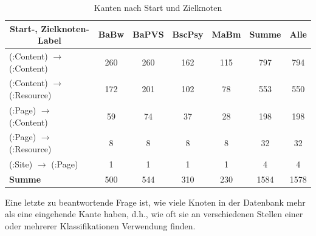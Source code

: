     \begin{table}[htb]
        \centering
        \begin{tabular}{|l|c|c|c|c|c|c|}
            \hline
            \multicolumn{1}{|c|}{\textbf{Start-, Zielknoten-Label}} & \textbf{BaBw} & \textbf{BaPVS} & \textbf{BscPsy} & \textbf{MaBm} & \textbf{Summe} & \textbf{Alle} \\ \hline
            (:Content) $\rightarrow$ (:Content)                           & 260           & 260            & 162             & 115           & 797            & 794           \\ \hline
            (:Content) $\rightarrow$ (:Resource)                         & 172           & 201            & 102             & 78            & 553            & 550           \\ \hline
            (:Page) $\rightarrow$ (:Content)                              & 59            & 74             & 37              & 28            & 198            & 198           \\ \hline
            (:Page) $\rightarrow$ (:Resource)                             & 8             & 8              & 8               & 8             & 32             & 32            \\ \hline
            (:Site) $\rightarrow$ (:Page)                                 & 1             & 1              & 1               & 1             & 4              & 4             \\ \hline
            \hline
            \textbf{Summe}                                          & 500           & 544            & 310             & 230           & 1584           & 1578          \\ \hline
        \end{tabular}
        \caption{Kanten nach Start und Zielknoten}
        \label{table:findingsTeachersFiguresEdgesByStartEndNodeLabel}
    \end{table}

    Eine letzte zu beantwortende Frage ist,
    wie viele Knoten in der Datenbank mehr als eine eingehende Kante haben,
    d.h., wie oft sie an verschiedenen Stellen einer oder mehrerer Klassifikationen Verwendung finden.

